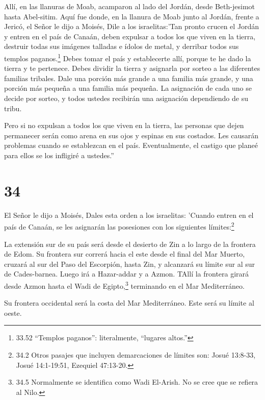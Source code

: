 Allí, en las llanuras de Moab, acamparon al lado del
Jordán, desde Beth-jesimot hasta Abel-sitim.  Aquí fue
donde, en la llanura de Moab junto al Jordán, frente a Jericó, el Señor
le dijo a Moisés,  Dile a los israelitas:'Tan pronto crucen
el Jordán y entren en el país de Canaán,  deben expulsar a
todos los que viven en la tierra, destruir todas sus imágenes talladas e
ídolos de metal, y derribar todos sus templos paganos.\footnote{33.52
  ``Templos paganos'': literalmente, ``lugares altos.''} 
Debes tomar el país y establecerte allí, porque te he dado la tierra y
te pertenece.  Debes dividir la tierra y asignarla por
sorteo a las diferentes familias tribales. Dale una porción más grande a
una familia más grande, y una porción más pequeña a una familia más
pequeña. La asignación de cada uno se decide por sorteo, y todos ustedes
recibirán una asignación dependiendo de su tribu.

 Pero si no expulsan a todos los que viven en la tierra,
las personas que dejen permanecer serán como arena en sus ojos y espinas
en sus costados. Les causarán problemas cuando se establezcan en el
país.  Eventualmente, el castigo que planeé para ellos se
los infligiré a ustedes.''

\hypertarget{section-33}{%
\section{34}\label{section-33}}

 El Señor le dijo a Moisés,  Dales esta orden a
los israelitas: 'Cuando entren en el país de Canaán, se les asignarán
las posesiones con los siguientes límites:\footnote{34.2 Otros pasajes
  que incluyen demarcaciones de límites son: Josué 13:8-33, Josué
  14:1-19:51, Ezequiel 47:13-20.}

 La extensión sur de su país será desde el desierto de Zin a
lo largo de la frontera de Edom. Su frontera sur correrá hacia el este
desde el final del Mar Muerto,  cruzará al sur del Paso del
Escorpión, hasta Zin, y alcanzará su límite sur al sur de Cades-barnea.
Luego irá a Hazar-addar y a Azmon.  TAllí la frontera girará
desde Azmon hasta el Wadi de Egipto,\footnote{34.5 Normalmente se
  identifica como Wadi El-Arish. No se cree que se refiera al Nilo.}
terminando en el Mar Mediterráneo.

 Su frontera occidental será la costa del Mar Mediterráneo.
Este será su límite al oeste.

